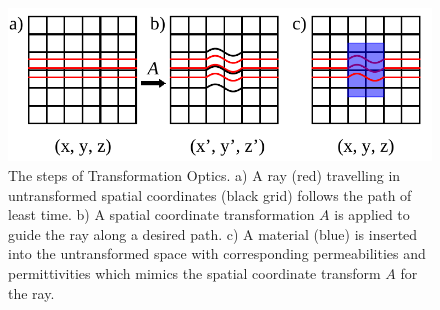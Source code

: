 \documentclass[11pt]{iopart}
\begin{document}
\begin{figure}
  \begin{center}
   \noindent\includegraphics[width=0.75\linewidth]{images/trans_Opt_edit.pdf}
  \end{center}
  \caption{The steps of Transformation Optics. a) A ray (red)
    travelling in untransformed spatial coordinates (black grid)
    follows the path of least time. b) A spatial coordinate
    transformation $A$ is applied to guide the ray along a desired
    path. c) A material (blue) is inserted into the untransformed
    space with corresponding permeabilities and permittivities which mimics
    the spatial coordinate transform $A$ for the ray. }
  \label{fig:TO}
\end{figure}
\end{document}

